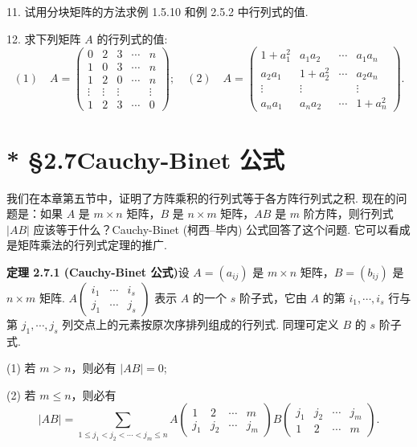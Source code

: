 \documentclass[UTF8, 12pt, fontset=fandol, oneside]{ctexart}
\begin{document}
11. 试用分块矩阵的方法求例 1.5.10 和例 2.5.2 中行列式的值.

12. 求下列矩阵 $A$ 的行列式的值:
\[
(1)\quad A=\left(\begin{array}{ccccc}
0 & 2 & 3 & \cdots & n\\
1 & 0 & 3 & \cdots & n\\
1 & 2 & 0 & \cdots & n\\
\vdots & \vdots & \vdots & & \vdots\\
1 & 2 & 3 & \cdots & 0
\end{array}\right);
\quad
(2)\quad A=\left(\begin{array}{cccc}
1+a_1^2 & a_1a_2 & \cdots & a_1a_n\\
a_2a_1 & 1+a_2^2 & \cdots & a_2a_n\\
\vdots & \vdots & & \vdots\\
a_na_1 & a_na_2 & \cdots & 1+a_n^2
\end{array}\right).
\]

\section*{* §2.7\quad Cauchy-Binet 公式}

我们在本章第五节中，证明了方阵乘积的行列式等于各方阵行列式之积. 现在的问题是：如果 $A$ 是 $m\times n$ 矩阵，$B$ 是 $n\times m$ 矩阵，$AB$ 是 $m$ 阶方阵，则行列式 $|AB|$ 应该等于什么？Cauchy-Binet (柯西--毕内) 公式回答了这个问题. 它可以看成是矩阵乘法的行列式定理的推广.

\noindent\textbf{定理 2.7.1 (Cauchy-Binet 公式)}\quad 设 $A=(a_{ij})$ 是 $m\times n$ 矩阵，$B=(b_{ij})$ 是 $n\times m$ 矩阵. $A\left(\begin{array}{ccc}i_1&\cdots&i_s\\ j_1&\cdots&j_s\end{array}\right)$ 表示 $A$ 的一个 $s$ 阶子式，它由 $A$ 的第 $i_1,\cdots,i_s$ 行与第 $j_1,\cdots,j_s$ 列交点上的元素按原次序排列组成的行列式. 同理可定义 $B$ 的 $s$ 阶子式.

(1) 若 $m>n$，则必有 $|AB|=0$;

(2) 若 $m\leq n$，则必有
\[
|AB|=\sum_{1\leq j_1<j_2<\cdots<j_m\leq n}
A\left(\begin{array}{cccc}
1 & 2 & \cdots & m\\
j_1 & j_2 & \cdots & j_m
\end{array}\right)
B\left(\begin{array}{cccc}
j_1 & j_2 & \cdots & j_m\\
1 & 2 & \cdots & m
\end{array}\right).
\]
\end{document}
